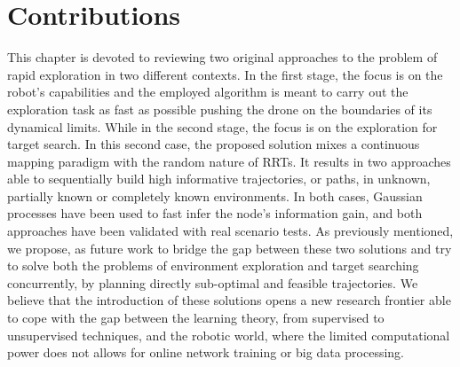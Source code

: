 \section{Contributions}
This chapter is devoted to reviewing two original approaches to the problem of rapid exploration in two different contexts.
In the first stage, the focus is on the robot's capabilities and the employed algorithm is meant to carry out the exploration task
as fast as possible pushing the drone on the boundaries of its dynamical limits. While in the second stage, the focus is on the
exploration for target search. In this second case, the proposed solution mixes a continuous mapping paradigm with the random
nature of RRTs. It results in two approaches able to sequentially build high informative trajectories, or paths, in unknown, partially
known or completely known environments. In both cases, Gaussian processes have been used to fast infer the node's information gain, and
both approaches have been validated with real scenario tests. As previously mentioned, we propose, as future work to bridge the gap
between these two solutions and try to solve both the problems of environment exploration and target searching concurrently, by
planning directly sub-optimal and feasible trajectories.
We believe that the introduction of these solutions opens a new research frontier able to cope with the gap between the learning theory,
from supervised to unsupervised techniques, and the robotic world, where the limited computational power does not allows for
online network training or big data processing.

